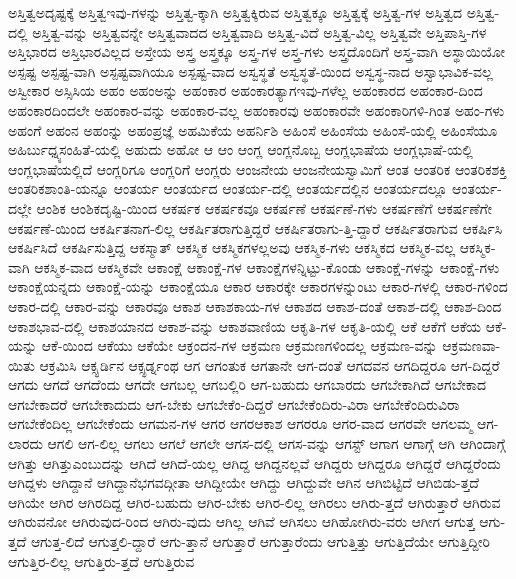 {ಅಸ್ತಿತ್ವಅದೃಷ್ಟಕ್ಕೆ
ಅಸ್ತಿತ್ವಇವು-ಗಳನ್ನು
ಅಸ್ತಿತ್ವ-ಕ್ಕಾಗಿ
ಅಸ್ತಿತ್ವಕ್ಕಿರುವ
ಅಸ್ತಿತ್ವಕ್ಕೂ
ಅಸ್ತಿತ್ವಕ್ಕೆ
ಅಸ್ತಿತ್ವ-ಗಳ
ಅಸ್ತಿತ್ವದ
ಅಸ್ತಿತ್ವ-ದಲ್ಲಿ
ಅಸ್ತಿತ್ವ-ವನ್ನು
ಅಸ್ತಿತ್ವವನ್ನೇ
ಅಸ್ತಿತ್ವವಾದದ
ಅಸ್ತಿತ್ವವಾದಿ
ಅಸ್ತಿತ್ವ-ವಿದೆ
ಅಸ್ತಿತ್ವ-ವಿಲ್ಲ
ಅಸ್ತಿತ್ವವೇ
ಅಸ್ತಿಪಾಸ್ತಿ-ಗಳ
ಅಸ್ತಿಭಾರದ
ಅಸ್ತಿಭಾರವಿಲ್ಲದ
ಅಸ್ತೇಯ
ಅಸ್ತ್ರ
ಅಸ್ತ್ರಕ್ಕೂ
ಅಸ್ತ್ರ-ಗಳ
ಅಸ್ತ್ರ-ಗಳು
ಅಸ್ತ್ರದೊಂದಿಗೆ
ಅಸ್ತ್ರ-ವಾಗಿ
ಅಸ್ಥಾಯಿಯೋ
ಅಸ್ಪಷ್ಟ
ಅಸ್ಪಷ್ಟ-ವಾಗಿ
ಅಸ್ಪಷ್ಟವಾಗಿಯೂ
ಅಸ್ಪಷ್ಟ-ವಾದ
ಅಸ್ವಸ್ಥತೆ
ಅಸ್ವಸ್ಥತೆ-ಯಿಂದ
ಅಸ್ವಸ್ಥ-ನಾದ
ಅಸ್ವಾಭಾವಿಕ-ವಲ್ಲ
ಅಸ್ವೀಕಾರ
ಅಸ್ಸಿಸಿಯ
ಅಹಂ
ಅಹಂಅನ್ನು
ಅಹಂಕಾರ
ಅಹಂಕಾರತ್ಯಾಗಇವು-ಗಳೆಲ್ಲ
ಅಹಂಕಾರದ
ಅಹಂಕಾರ-ದಿಂದ
ಅಹಂಕಾರದಿಂದಲೇ
ಅಹಂಕಾರ-ವನ್ನು
ಅಹಂಕಾರ-ವಲ್ಲ
ಅಹಂಕಾರವು
ಅಹಂಕಾರವೇ
ಅಹಂಕಾರಿಗಳಿ-ಗಿಂತ
ಅಹಂ-ಗಳು
ಅಹಂಗೆ
ಅಹಂನ
ಅಹಂನ್ನು
ಅಹಂಪ್ರಜ್ಞೆ
ಅಹಮಿಕೆಯ
ಅಹರ್ನಿಶಿ
ಅಹಿಂಸೆ
ಅಹಿಂಸೆಯ
ಅಹಿಂಸೆ-ಯಲ್ಲಿ
ಅಹಿಂಸೆಯೂ
ಅಹಿರ್ಬುಧ್ನ್ಯಸಂಹಿತೆ-ಯಲ್ಲಿ
ಅಹುದು
ಅಹೋ
ಆ
ಆಂ
ಆಂಗ್ಲ
ಆಂಗ್ಲನೊಬ್ಬ
ಆಂಗ್ಲಭಾಷೆಯ
ಆಂಗ್ಲಭಾಷೆ-ಯಲ್ಲಿ
ಆಂಗ್ಲಭಾಷೆಯಲ್ಲಿದೆ
ಆಂಗ್ಲರಿಗೂ
ಆಂಗ್ಲರಿಗೆ
ಆಂಗ್ಲರು
ಆಂಜನೇಯ
ಆಂಜನೇಯಸ್ವಾಮಿಗೆ
ಆಂತ
ಆಂತರಿಕ
ಆಂತರಿಕಶಕ್ತಿ
ಆಂತರಿಕಶಾಂತಿ-ಯನ್ನೂ
ಆಂತರ್ಯ
ಆಂತರ್ಯದ
ಆಂತರ್ಯ-ದಲ್ಲಿ
ಆಂತರ್ಯದಲ್ಲಿನ
ಆಂತರ್ಯದಲ್ಲೂ
ಆಂತರ್ಯ-ದಲ್ಲೇ
ಆಂಶಿಕ
ಆಂಶಿಕದೃಷ್ಟಿ-ಯಿಂದ
ಆಕರ್ಷಕ
ಆಕರ್ಷಕವೂ
ಆಕರ್ಷಣೆ
ಆಕರ್ಷಣೆ-ಗಳು
ಆಕರ್ಷಣೆಗೆ
ಆಕರ್ಷಣೆಗೇ
ಆಕರ್ಷಣೆ-ಯಿಂದ
ಆಕರ್ಷಿತನಾಗ-ಲಿಲ್ಲ
ಆಕರ್ಷಿತರಾಗುತ್ತಿದ್ದರೆ
ಆಕರ್ಷಿತರಾಗು-ತ್ತಿ-ದ್ದಾರೆ
ಆಕರ್ಷಿತರಾಗುವ
ಆಕರ್ಷಿಸಿ
ಆಕರ್ಷಿಸಿದೆ
ಆಕರ್ಷಿಸುತ್ತಿದ್ದ
ಆಕಸ್ಮಾತ್
ಆಕಸ್ಮಿಕ
ಆಕಸ್ಮಿಕಗಳಲ್ಲಅವು
ಆಕಸ್ಮಿಕ-ಗಳು
ಆಕಸ್ಮಿಕದ
ಆಕಸ್ಮಿಕ-ವಲ್ಲ
ಆಕಸ್ಮಿಕ-ವಾಗಿ
ಆಕಸ್ಮಿಕ-ವಾದ
ಆಕಸ್ಮಿಕವೇ
ಆಕಾಂಕ್ಷೆ
ಆಕಾಂಕ್ಷೆ-ಗಳ
ಆಕಾಂಕ್ಷೆಗಳನ್ನಿಟ್ಟು-ಕೊಂಡು
ಆಕಾಂಕ್ಷೆ-ಗಳನ್ನು
ಆಕಾಂಕ್ಷೆ-ಗಳು
ಆಕಾಂಕ್ಷೆಯನ್ನದು
ಆಕಾಂಕ್ಷೆ-ಯನ್ನು
ಆಕಾಂಕ್ಷೆಯೂ
ಆಕಾರ
ಆಕಾರಕ್ಕೇ
ಆಕಾರಗಳನ್ನುಂಟು
ಆಕಾರ-ಗಳಲ್ಲಿ
ಆಕಾರ-ಗಳಿಂದ
ಆಕಾರ-ದಲ್ಲಿ
ಆಕಾರ-ವನ್ನು
ಆಕಾರವೂ
ಆಕಾಶ
ಆಕಾಶಕಾಯ-ಗಳ
ಆಕಾಶದ
ಆಕಾಶ-ದಂತೆ
ಆಕಾಶ-ದಲ್ಲಿ
ಆಕಾಶ-ದಿಂದ
ಆಕಾಶಭಾವ-ದಲ್ಲಿ
ಆಕಾಶಯಾನದ
ಆಕಾಶ-ವನ್ನು
ಆಕಾಶವಾಣಿಯ
ಆಕೃತಿ-ಗಳ
ಆಕೃತಿ-ಯಲ್ಲಿ
ಆಕೆ
ಆಕೆಗೆ
ಆಕೆಯ
ಆಕೆ-ಯನ್ನು
ಆಕೆ-ಯಿಂದ
ಆಕೆಯು
ಆಕೆಯೇ
ಆಕ್ರಂದನ-ಗಳ
ಆಕ್ರಮಣ
ಆಕ್ರಮಣಗಳಿಂದಲ್ಲ
ಆಕ್ರಮಣ-ವನ್ನು
ಆಕ್ರಮಣವಾ-ಯಿತು
ಆಕ್ರಮಿಸಿ
ಆಕ್ಸ್ಫರ್ಡಿನ
ಆಕ್ಸ್ಫರ್ಡ್ನಂಥ
ಆಗ
ಆಗಂತುಕ
ಆಗತಾನೇ
ಆಗ-ದಂತೆ
ಆಗದವನ
ಆಗದಿದ್ದರೂ
ಆಗ-ದಿದ್ದರೆ
ಆಗದು
ಆಗದೆ
ಆಗದೆಂದು
ಆಗದೇ
ಆಗಬಲ್ಲ
ಆಗಬಲ್ಲಿರಿ
ಆಗ-ಬಹುದು
ಆಗಬಾರದು
ಆಗಬೇಕಾಗಿದೆ
ಆಗಬೇಕಾದ
ಆಗಬೇಕಾದರೆ
ಆಗಬೇಕಾದುದು
ಆಗ-ಬೇಕು
ಆಗಬೇಕೆಂ-ದಿದ್ದರೆ
ಆಗಬೇಕೆಂದಿರು-ವಿರಾ
ಆಗಬೇಕೆಂದಿರುವಿರಾ
ಆಗಬೇಕೆಂದಿಲ್ಲ
ಆಗಬೇಕೆಂದು
ಆಗಮನ-ಗಳ
ಆಗರ
ಆಗರಆಕಾಶ
ಆಗರರೂ
ಆಗರ-ವಾದ
ಆಗರವೇ
ಆಗಲಮ್ಮ
ಆಗ-ಲಾರದು
ಆಗಲಿ
ಆಗ-ಲಿಲ್ಲ
ಆಗಲು
ಆಗಲೆ
ಆಗಲೇ
ಆಗಸ-ದಲ್ಲಿ
ಆಗಸ-ವನ್ನು
ಆಗಸ್ಟ್
ಆಗಾಗ
ಆಗಾಗ್ಗೆ
ಆಗಿ
ಆಗಿಂದಾಗ್ಗೆ
ಆಗಿತ್ತು
ಆಗಿತ್ತುಎಂಬುದನ್ನು
ಆಗಿದೆ
ಆಗಿದೆ-ಯಲ್ಲ
ಆಗಿದ್ದ
ಆಗಿದ್ದನಲ್ಲವೆ
ಆಗಿದ್ದರು
ಆಗಿದ್ದರೂ
ಆಗಿದ್ದರೆ
ಆಗಿದ್ದರೆಂದು
ಆಗಿದ್ದಳು
ಆಗಿದ್ದಾನೆ
ಆಗಿದ್ದಾನೆಭಗವದ್ಗೀತಾ
ಆಗಿದ್ದೀಯೇ
ಆಗಿದ್ದು
ಆಗಿದ್ದುವೇ
ಆಗಿನ
ಆಗಿಬಿಟ್ಟಿದೆ
ಆಗಿಬಿಡು-ತ್ತದೆ
ಆಗಿಯೇ
ಆಗಿರ
ಆಗಿರದಿದ್ದ
ಆಗಿರ-ಬಹುದು
ಆಗಿರ-ಬೇಕು
ಆಗಿರ-ಲಿಲ್ಲ
ಆಗಿರಲು
ಆಗಿರು-ತ್ತದೆ
ಆಗಿರುತ್ತಾರೆ
ಆಗಿರುವ
ಆಗಿರುವನೋ
ಆಗಿರುವುದ-ರಿಂದ
ಆಗಿರು-ವುದು
ಆಗಿಲ್ಲ
ಆಗಿವೆ
ಆಗಿಸಲು
ಆಗಿಹೋಗಿರು-ವರು
ಆಗೀಗ
ಆಗುತ್ತ
ಆಗು-ತ್ತದೆ
ಆಗುತ್ತ-ಲಿದೆ
ಆಗುತ್ತಲಿ-ದ್ದಾರೆ
ಆಗು-ತ್ತಾನೆ
ಆಗುತ್ತಾರೆ
ಆಗುತ್ತಾರೆಂದು
ಆಗುತ್ತಿತ್ತು
ಆಗುತ್ತಿದೆಯೇ
ಆಗುತ್ತಿದ್ದೀರಿ
ಆಗುತ್ತಿರ-ಲಿಲ್ಲ
ಆಗುತ್ತಿರು-ತ್ತದೆ
ಆಗುತ್ತಿರುವ
}
